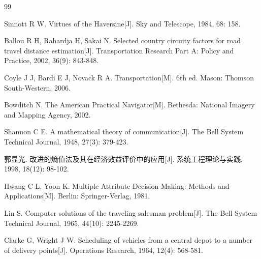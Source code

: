 \documentclass[12pt,fontset=fandol]{ctexart}
\begin{document}
\begin{thebibliography}{99}

Sinnott R W. Virtues of the Haversine[J]. Sky and Telescope, 1984, 68: 158.

Ballou R H, Rahardja H, Sakai N. Selected country circuity factors for road travel distance estimation[J]. Transportation Research Part A: Policy and Practice, 2002, 36(9): 843-848.

Coyle J J, Bardi E J, Novack R A. Transportation[M]. 6th ed. Mason: Thomson South-Western, 2006.

Bowditch N. The American Practical Navigator[M]. Bethesda: National Imagery and Mapping Agency, 2002.

Shannon C E. A mathematical theory of communication[J]. The Bell System Technical Journal, 1948, 27(3): 379-423.

郭显光. 改进的熵值法及其在经济效益评价中的应用[J]. 系统工程理论与实践, 1998, 18(12): 98-102.

Hwang C L, Yoon K. Multiple Attribute Decision Making: Methods and Applications[M]. Berlin: Springer-Verlag, 1981.

Lin S. Computer solutions of the traveling salesman problem[J]. The Bell System Technical Journal, 1965, 44(10): 2245-2269.

Clarke G, Wright J W. Scheduling of vehicles from a central depot to a number of delivery points[J]. Operations Research, 1964, 12(4): 568-581.

\end{thebibliography}

\newpage

\end{document}
